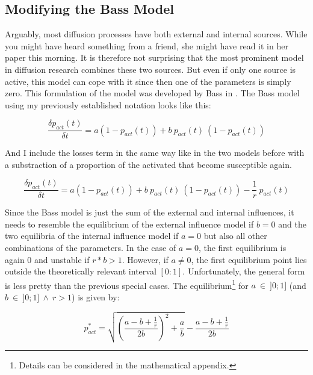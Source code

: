 \documentclass[a4paper,12pt]{article}
\begin{document}
\subsection{Modifying the Bass Model}

Arguably, most diffusion processes have both external and internal sources. While you might have heard something from a friend, she might have read it in her paper this morning. It is therefore not surprising that the most prominent model in diffusion research combines these two sources. But even if only one source is active, this model can cope with it since then one of the parameters is simply zero. This formulation of the model was developed by Bass in \citeyear{bassNewProductGrowth1969}. The Bass model using my previously established notation looks like this:
    
\begin{equation}
\frac{\delta p_{act}(t)}{\delta t} = a (1 - p_{act}(t)) + b \ p_{act}(t) \ (1 - p_{act}(t))
\end{equation}
    
And I include the losses term in the same way like in the two models before with a substraction of a proportion of the activated that become susceptible again.

\begin{equation}
\frac{\delta p_{act}(t)}{\delta t} = a (1 - p_{act}(t)) + b \ p_{act}(t) \ (1 - p_{act}(t))  - \frac{1}{r} \ p_{act}(t)
\end{equation}
    
Since the Bass model is just the sum of the external and internal influences, it needs to resemble the equilibrium of the external influence model if $b = 0$ and the two equilibria of the internal influence model if $a = 0$ but also all other combinations of the parameters. In the case of $a = 0$, the first equilibrium is again 0 and unstable if $r * b > 1$. However, if $a \neq 0$, the first equilibrium point lies outside the theoretically relevant interval $[0:1]$.  Unfortunately, the general form is less pretty than the previous special cases. The equilibrium\footnote{Details can be considered in the mathematical appendix.} for $a  \ \in \ ]0;1]$ (and $b \ \in \ ]0;1] \ \land \ r > 1$) is given by:

\begin{equation}
p_{act}^{*} = \sqrt{\left( \frac{a - b + \frac{1}{r}}{2b} \right)^2 + \frac{a}{b}} - \frac{a - b + \frac{1}{r}}{2b}
\end{equation} 
\end{document}
